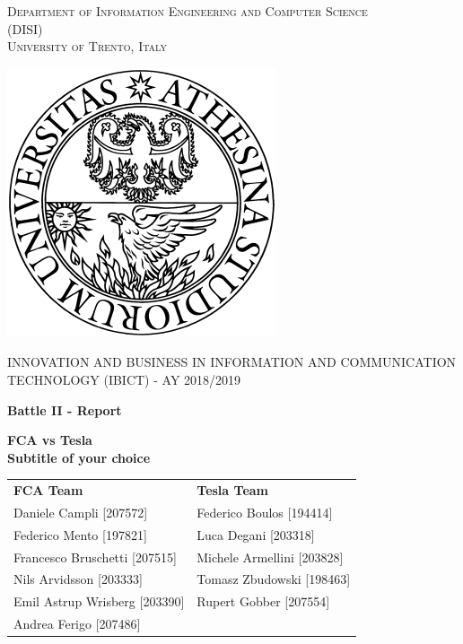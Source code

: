 \begin{titlepage}
	\begin{center}
   	{\scshape\LARGE
    	Department of Information Engineering and Computer Science\\ 
      	(DISI)\\ 
      	University of Trento, Italy\\\par}
      	\vspace{1cm}
      	\includegraphics[scale=0.5]{resources/logo}\\
	\vspace{1cm}
	{\scshape\Large INNOVATION AND BUSINESS IN INFORMATION AND COMMUNICATION TECHNOLOGY (IBICT) - AY 2018/2019\par}
	\vspace{1.5cm}
	{\huge\bfseries Battle II - Report\\\par}
	\vspace{1cm}
	{\Large\bfseries FCA vs Tesla\\
	Subtitle of your choice\par}
      	\vfill
        \begin{tabular}{ll}
        \textbf{FCA Team}           &       \textbf{Tesla Team}         \\
       	Daniele Campli [207572]     &       Federico Boulos [194414]   \\
	    Federico Mento [197821]     &       Luca Degani [203318]       \\
	    Francesco Bruschetti [207515]       &       Michele Armellini [203828]        \\
	    Nils Arvidsson [203333]        &       Tomasz Zbudowski [198463]      \\
	    Emil Astrup Wrisberg [203390]        &          Rupert Gobber [207554]\\
	    Andrea Ferigo [207486]    \\
        \end{tabular}
      	\vfill
      	\vfill
	\end{center}
\end{titlepage}
